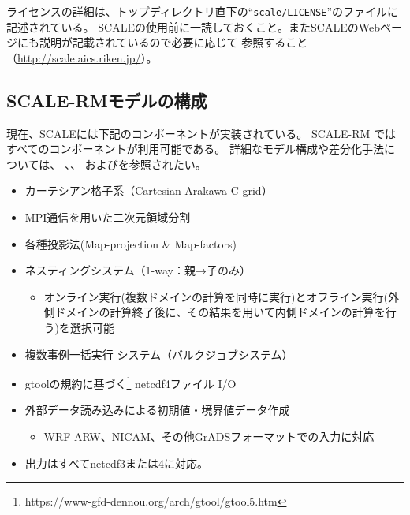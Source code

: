 ライセンスの詳細は、トップディレクトリ直下の``\verb|scale/LICENSE|''のファイルに記述されている。
SCALEの使用前に一読しておくこと。またSCALEのWebページにも説明が記載されているので必要に応じて
参照すること（\url{http://scale.aics.riken.jp/}）。



\subsection{SCALE-RMモデルの構成}
現在、SCALEには下記のコンポーネントが実装されている。
SCALE-RM ではすべてのコンポーネントが利用可能である。
詳細なモデル構成や差分化手法については、
\citet{scale_2015}、\citet{satoy_2015b}、
および\citet{nishizawa_2015}を参照されたい。\\


\begin{itemize}
 \item カーテシアン格子系（Cartesian Arakawa C-grid）
 \item MPI通信を用いた二次元領域分割
 \item 各種投影法(Map-projection \& Map-factors)
 \item ネスティングシステム（1-way：親→子のみ）
   \begin{itemize}
    \item オンライン実行(複数ドメインの計算を同時に実行)とオフライン実行(外側ドメインの計算終了後に、その結果を用いて内側ドメインの計算を行う)を選択可能
   \end{itemize}
 \item 複数事例一括実行 システム（バルクジョブシステム）
 \item gtoolの規約に基づく\footnote{https://www-gfd-dennou.org/arch/gtool/gtool5.htm}
netcdf4ファイル I/O
 \item 外部データ読み込みによる初期値・境界値データ作成
   \begin{itemize}
    \item WRF-ARW、NICAM、その他GrADSフォーマットでの入力に対応
   \end{itemize}
 \item 出力はすべてnetcdf3または4に対応。
\end{itemize}

